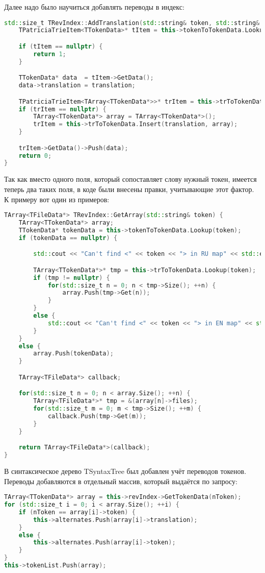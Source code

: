 Далее надо было научиться добавлять переводы в индекс:
\begin{lstlisting}[language=C++]
std::size_t TRevIndex::AddTranslation(std::string& token, std::string& translation) {
    TPatriciaTrieItem<TTokenData>* tItem = this->tokenToTokenData.LookupNode(token);

    if (tItem == nullptr) {
        return 1;
    }

    TTokenData* data  = tItem->GetData();
    data->translation = translation;

    TPatriciaTrieItem<TArray<TTokenData*>>* trItem = this->trToTokenData.LookupNode(translation);
    if (trItem == nullptr) {
        TArray<TTokenData*> array = TArray<TTokenData*>();
        trItem = this->trToTokenData.Insert(translation, array);
    }

    trItem->GetData()->Push(data);
    return 0;
}
\end{lstlisting}

Так как вместо одного поля, который сопоставляет слову нужный токен, имеется теперь два таких поля, в коде были внесены правки, учитывающие этот фактор. К примеру вот один из примеров:
\begin{lstlisting}[language=C++]
TArray<TFileData*> TRevIndex::GetArray(std::string& token) {
    TArray<TTokenData*> array;
    TTokenData* tokenData = this->tokenToTokenData.Lookup(token);
    if (tokenData == nullptr) {

        std::cout << "Can't find <" << token << "> in RU map" << std::endl;

        TArray<TTokenData*>* tmp = this->trToTokenData.Lookup(token);
        if (tmp != nullptr) {
            for(std::size_t n = 0; n < tmp->Size(); ++n) {
                array.Push(tmp->Get(n));
            }
        }
        else {
            std::cout << "Can't find <" << token << "> in EN map" << std::endl;
        }
    }
    else {
        array.Push(tokenData);
    }

    TArray<TFileData*> callback;

    for(std::size_t n = 0; n < array.Size(); ++n) {
        TArray<TFileData*>* tmp = &(array[n]->files);
        for(std::size_t m = 0; m < tmp->Size(); ++m) {
            callback.Push(tmp->Get(m));
        }
    }

    return TArray<TFileData*>(callback);
}
\end{lstlisting}

В синтаксическое дерево TSyntaxTree был добавлен учёт переводов токенов. Переводы добавляются в отдельный массив, который выдаётся по запросу:
\begin{lstlisting}[language=C++]
TArray<TTokenData*> array = this->revIndex->GetTokenData(nToken);
for (std::size_t i = 0; i < array.Size(); ++i) {
    if (nToken == array[i]->token) {
        this->alternates.Push(array[i]->translation);
    }
    else {
        this->alternates.Push(array[i]->token);
    }
}
this->tokenList.Push(array);
\end{lstlisting}

